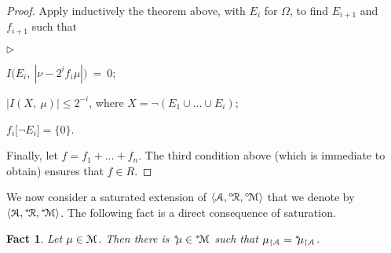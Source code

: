 \documentclass[12pt,letterpaper,oneside,reqno]{amsart}
\newcommand{\mylabel}[1]{{#1}\hfill}
\renewenvironment{itemize}
  {\begin{list}{$\triangleright$}{%
   \setlength{\parskip}{0mm}
   \setlength{\topsep}{.2\baselineskip}
   \setlength{\rightmargin}{0mm}
   \setlength{\listparindent}{0mm}
   \setlength{\itemindent}{0mm}
   \setlength{\labelwidth}{3ex}
   \setlength{\itemsep}{.2\baselineskip}
   \setlength{\parsep}{.2\baselineskip}
   \setlength{\partopsep}{0mm}
   \setlength{\labelsep}{1ex}
   \setlength{\leftmargin}{\labelwidth+\labelsep}
   \let\makelabel\mylabel}}{%
   \end{list}}
\theoremstyle{plain}
\newtheorem{fact}[theorem]{Fact}
\newtheorem{corollary}[theorem]{Corollary}
\theoremstyle{remark}
\begin{document}
\begin{proof}
  Apply inductively the theorem above, with $E_i$ for $\Omega$, to find $E_{i+1}$ and $f_{i+1}$ such that
  \begin{itemize}
    \item[1$_i$.] $I\big(E_i,\ |\nu-2^if_i\mu|\big)\ =\ 0$;
    \item[2$_i$.] $|I(X,\ \mu)|\le2^{-i}$, where $X=\neg(E_1\cup\dots\cup E_i)$;
    \item[3$_i$.] $f_i\big[\neg E_i]=\{0\}$.
  \end{itemize}
  Finally, let $f=f_1+\dots+f_n$.
  The third condition above (which is immediate to obtain) ensures that $f\in R$.
\end{proof}





We now consider a saturated extension of $\langle{\EuScript A},{}^{\circ\!}{\EuScript R},{}^{\circ\!}{\EuScript M}\rangle$ that we denote by $\langle{}^{*\!\!\!}{\EuScript A},{}^{*\!}{\EuScript R},{}^{*\!}{\EuScript M}\rangle$.
The following fact is a direct consequence of saturation.

\begin{fact}
  Let $\mu\in{\EuScript M}$.
  Then there is ${}^{*\!\!}\mu\in{}^{*\!}{\EuScript M}$ such that $\mu_{\restriction{\EuScript A}}={}^{*\!\!}\mu_{\restriction{\EuScript A}}$.
\end{fact}
\end{document}

